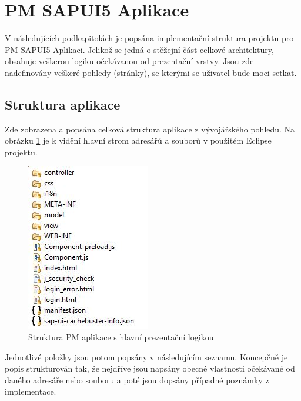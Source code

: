 \documentclass[thesis=M,czech]{FITthesis}[2012/06/26]
\begin{document}
\section{PM SAPUI5 Aplikace}
V následujících podkapitolách je popsána implementační struktura projektu pro PM SAPUI5 Aplikaci. Jelikož se jedná o stěžejní část celkové architektury, obsahuje veškerou logiku očekávanou od prezentační vrstvy. Jsou zde nadefinovány veškeré pohledy (stránky), se kterými se uživatel bude moci setkat.  

\subsection{Struktura aplikace}
\label{ssec:struckuta_pm_aplikace}
Zde zobrazena a popsána celková struktura aplikace z vývojářského pohledu. Na obrázku \ref{img:pmfiori_app_struct} je k vidění hlavní strom adresářů a souborů v použitém Eclipse projektu. 

\begin{figure}[H]
	\centering
	\includegraphics[]{images/fiori_app_struct}
	\caption{Struktura PM aplikace s hlavní prezentační logikou}
	\label{img:pmfiori_app_struct}
\end{figure}

Jednotlivé položky jsou potom popsány v následujícím seznamu. Koncepčně je popis strukturován tak, že nejdříve jsou napsány obecné vlastnosti očekávané od daného adresáře nebo souboru a poté jsou dopsány případné poznámky z implementace.
\end{document}
